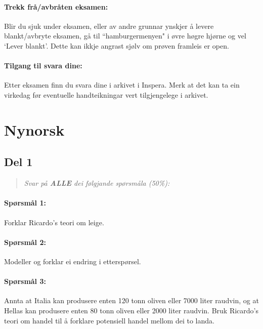 \documentclass[a4paper,12pt,fleqn]{article}
\begin{document}
\paragraph{\textbf{Trekk frå/avbråten eksamen:}} Blir du sjuk under eksamen,
eller av andre grunnar ynskjer å levere blankt/avbryte eksamen, gå til
``hamburgermenyen" i øvre høgre hjørne og vel `Lever blankt'. Dette kan ikkje
angrast sjølv om prøven framleis er open.

\paragraph{\textbf{Tilgang til svara dine:}} Etter eksamen finn du svara dine i
arkivet i Inspera. Merk at det kan ta ein virkedag før eventuelle handteikningar
vert tilgjengelege i arkivet.

\clearpage
\section*{Nynorsk}
\subsection*{Del 1}

\begin{quote}
	\textit{Svar på \textbf{ALLE} dei følgjande spørsmåla (50\%): }
\end{quote}

\paragraph{\textbf{Spørsmål 1:}}

Forklar Ricardo's teori om leige.

\paragraph{\textbf{Spørsmål 2:}}

Modeller og forklar ei endring i etterspørsel.

\paragraph{\textbf{Spørsmål 3:}}

Annta at Italia kan produsere enten 120 tonn oliven eller 7000 liter raudvin, og
at Hellas kan produsere enten 80 tonn oliven eller 2000 liter raudvin. Bruk
Ricardo's teori om handel til å forklare potensiell handel mellom dei to landa.
\end{document}
